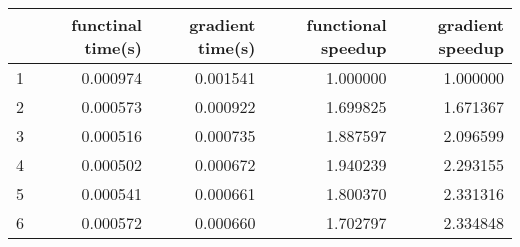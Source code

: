 \begin{tabular}{lrrrr}
\toprule
{} &  functinal time(s) &  gradient time(s) &  functional speedup &  gradient speedup \\
\midrule
1 &           0.000974 &          0.001541 &            1.000000 &          1.000000 \\
2 &           0.000573 &          0.000922 &            1.699825 &          1.671367 \\
3 &           0.000516 &          0.000735 &            1.887597 &          2.096599 \\
4 &           0.000502 &          0.000672 &            1.940239 &          2.293155 \\
5 &           0.000541 &          0.000661 &            1.800370 &          2.331316 \\
6 &           0.000572 &          0.000660 &            1.702797 &          2.334848 \\
\bottomrule
\end{tabular}
